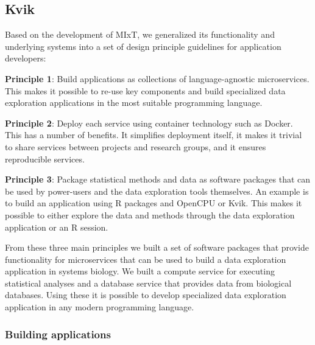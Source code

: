 \subsection*{Kvik}
Based on the development of MIxT, we generalized its functionality and
underlying systems into a set of design principle guidelines for application
developers: 

\textbf{Principle 1}: Build applications as collections of language-agnostic
microservices. This makes it possible to re-use key components and build
specialized data exploration applications in the most suitable programming
language. 

\textbf{Principle 2}: Deploy each service using container technology such as
Docker. This has a number of benefits. It simplifies deployment itself, it makes
it trivial to share services between projects and research groups, and it
ensures reproducible services.

\textbf{Principle 3}: Package statistical methods and data as software packages
that can be used by power-users and the data exploration tools themselves. An
example is to build an application using R packages and OpenCPU or Kvik. This
makes it possible to either explore the data and methods through the data
exploration application or an R session. 

From these three main principles we built a set of software packages that
provide functionality for microservices that can be used to build a data
exploration application in systems biology. We built a compute service for
executing statistical analyses and a database service that provides data from
biological databases. Using these it is possible to develop specialized data
exploration application in any modern programming language.  



\subsubsection*{Building applications} 

